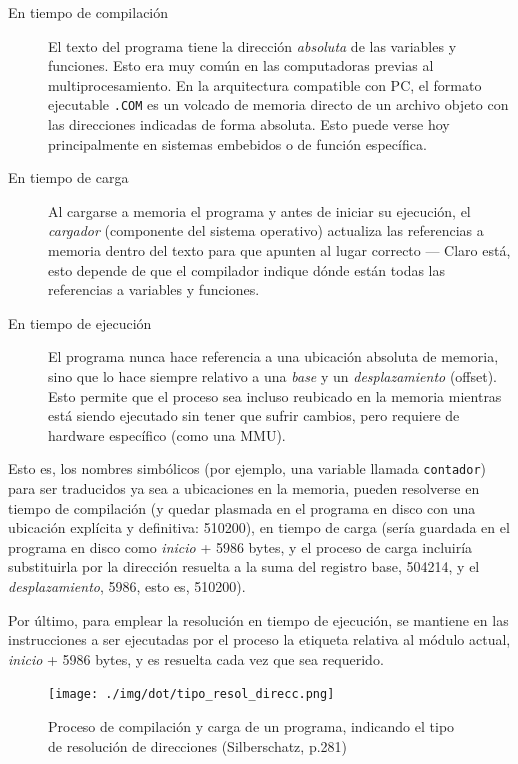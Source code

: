 \documentclass[11pt,fleqn]{book} %
\begin{document}
\begin{description}
\item[En tiempo de compilación] El texto del programa tiene la dirección
     \emph{absoluta} de las variables y funciones. Esto era muy común en las
     computadoras previas al multiprocesamiento. En la arquitectura
     compatible con PC, el formato ejecutable \texttt{.COM} es un volcado de
     memoria directo de un archivo objeto con las direcciones
     indicadas de forma absoluta. Esto puede verse hoy
     principalmente en sistemas embebidos o de función específica.
\item[En tiempo de carga] Al cargarse a memoria el programa y antes de
     iniciar su ejecución, el \emph{cargador} (componente del sistema
     operativo) actualiza las referencias a memoria dentro del texto
     para que apunten al lugar correcto — Claro está, esto depende de
     que el compilador indique dónde están todas las referencias a
     variables y funciones.
\item[En tiempo de ejecución] El programa nunca hace referencia a una
     ubicación absoluta de memoria, sino que lo hace siempre relativo
     a una \emph{base} y un \emph{desplazamiento} (offset). Esto permite que el
     proceso sea incluso reubicado en la memoria mientras está siendo
     ejecutado sin tener que sufrir cambios, pero requiere de hardware
     específico (como una MMU).
\end{description}

Esto es, los nombres simbólicos (por ejemplo, una variable llamada
\texttt{contador}) para ser traducidos ya sea a ubicaciones en la memoria,
pueden resolverse en tiempo de compilación (y quedar plasmada en el
programa en disco con una ubicación explícita y definitiva: 510200),
en tiempo de carga (sería guardada en el programa en disco como
\emph{inicio} + 5986 bytes, y el proceso de carga incluiría substituirla
por la dirección resuelta a la suma del registro base, 504214, y el
\emph{desplazamiento}, 5986, esto es, 510200).

Por último, para emplear la resolución en tiempo de ejecución, se
mantiene en las instrucciones a ser ejecutadas por el proceso la
etiqueta relativa al módulo actual, \emph{inicio} + 5986 bytes, y es
resuelta cada vez que sea requerido.

\begin{figure}[htb]
\centering
\texttt{[image: ./img/dot/tipo\_resol\_direcc.png]}
\caption{\label{MEM_tipo_resol_direcc}Proceso de compilación y carga de un programa, indicando el tipo de resolución de direcciones (Silberschatz, p.281)}
\end{figure}
\end{document}
